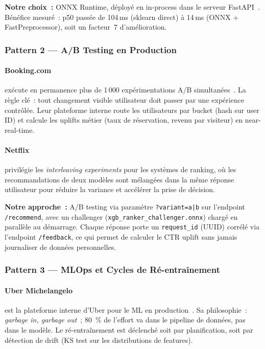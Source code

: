 \documentclass[12pt, a4paper]{report}
\begin{document}
\textbf{Notre choix~:} ONNX Runtime, déployé en in-process dans le
serveur FastAPI~\cite{onnx}. Bénéfice mesuré~: p50 passée de 104\,ms (sklearn
direct) à 14\,ms (ONNX + FastPreprocessor), soit un facteur~7
d'amélioration.

\subsubsection{Pattern 2 --- A/B Testing en Production}

\paragraph{Booking.com} exécute en permanence plus de 1\,000
expérimentations A/B simultanées~\cite{booking-ml}. La règle clé~: tout changement
visible utilisateur doit passer par une expérience contrôlée. Leur
plateforme interne route les utilisateurs par bucket (hash sur user ID)
et calcule les uplifts métier (taux de réservation, revenu par
visiteur) en near-real-time.

\paragraph{Netflix} privilégie les \textit{interleaving experiments}
pour les systèmes de ranking, où les recommandations de deux modèles
sont mélangées dans la même réponse utilisateur pour réduire la
variance et accélérer la prise de décision.

\textbf{Notre approche~:} A/B testing via paramètre \texttt{?variant=a|b}
sur l'endpoint \texttt{/recommend}, avec un challenger
(\texttt{xgb\_ranker\_challenger.onnx}) chargé en parallèle au démarrage.
Chaque réponse porte un \texttt{request\_id} (UUID) corrélé via
l'endpoint \texttt{/feedback}, ce qui permet de calculer le CTR uplift
sans jamais journaliser de données personnelles.

\subsubsection{Pattern 3 --- MLOps et Cycles de Ré-entraînement}

\paragraph{Uber Michelangelo} est la plateforme interne d'Uber pour
le ML en production~\cite{michelangelo}. Sa philosophie~: \textit{garbage in, garbage out}~;
80~\% de l'effort va dans le pipeline de données, pas dans le modèle.
Le ré-entraînement est déclenché soit par planification, soit par
détection de drift (KS test sur les distributions de features).
\end{document}
